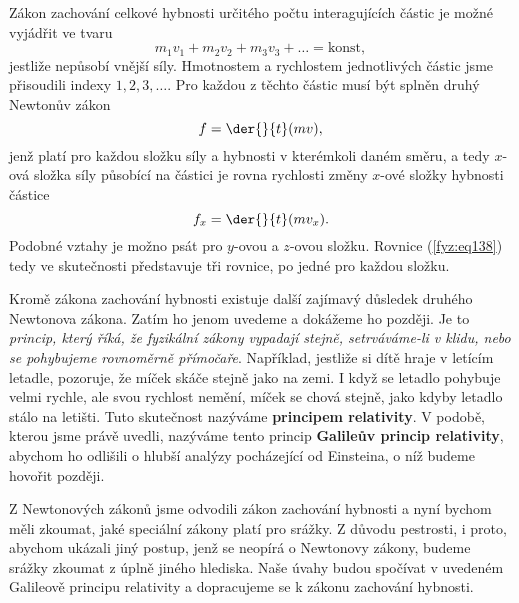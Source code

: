     Zákon zachování celkové hybnosti určitého počtu interagujících částic je možné vyjádřit ve tvaru
    \begin{equation}\label{fyz:eq138}
      m_1v_1 + m_2v_2 + m_3v_3 + \ldots = \text{konst},
    \end{equation}
    jestliže nepůsobí vnější síly. Hmotnostem a rychlostem jednotlivých částic jsme přisoudili 
    indexy \(1, 2, 3, \ldots\). Pro každou z těchto částic musí být splněn druhý Newtonův zákon
    \begin{equation}\label{fyz:eq139}
      f = \der{ }{t}(mv),
    \end{equation}
    jenž platí pro každou složku síly a hybnosti v kterémkoli daném směru, a tedy \(x\)-ová složka 
    síly působící na částici je rovna rychlosti změny \(x\)-ové složky hybnosti částice
    \begin{equation}\label{fyz:eq140}
      f_x = \der{ }{t}(mv_x).
    \end{equation}
    Podobné vztahy je možno psát pro \(y\)-ovou a \(z\)-ovou složku. Rovnice (\ref{fyz:eq138}) tedy 
    ve skutečnosti představuje tři rovnice, po jedné pro každou složku.
    
    Kromě zákona zachování hybnosti existuje další zajímavý důsledek druhého Newtonova zákona. 
    Zatím ho jenom uvedeme a dokážeme ho později. Je to \emph{princip, který říká, že fyzikální 
    zákony vypadají stejně, setrváváme-li v klidu, nebo se pohybujeme rovnoměrně přímočaře}. 
    Například, jestliže si dítě hraje v letícím letadle, pozoruje, že míček skáče stejně jako na 
    zemi. I když se letadlo pohybuje velmi rychle, ale svou rychlost nemění, míček se chová stejně, 
    jako kdyby letadlo stálo na letišti. Tuto skutečnost nazýváme \textbf{principem relativity}. V 
    podobě, kterou jsme právě uvedli, nazýváme tento princip \textbf{Galileův princip relativity}, 
    abychom ho odlišili o hlubší analýzy pocházející od Einsteina, o níž budeme hovořit později.
    
    Z Newtonových zákonů jsme odvodili zákon zachování hybnosti a nyní bychom měli zkoumat, jaké 
    speciální zákony platí pro srážky. Z důvodu pestrosti, i proto, abychom ukázali jiný postup, 
    jenž se neopírá o Newtonovy zákony, budeme srážky zkoumat z úplně jiného hlediska. Naše úvahy 
    budou spočívat v uvedeném Galileově principu relativity a dopracujeme se k zákonu zachování 
    hybnosti.
    
